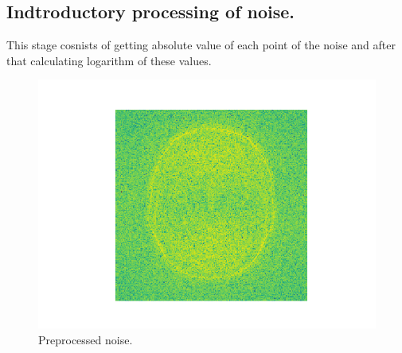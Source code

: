 \subsection*{Indtroductory processing of noise.}
This stage cosnists of getting absolute value of each point of the noise and after that calculating logarithm of these values.
\begin{figure}[H]
	\centering{}
		\includegraphics[scale=0.7]{figures/module03/70_log}
	\caption{Preprocessed noise.} 
\end{figure}
